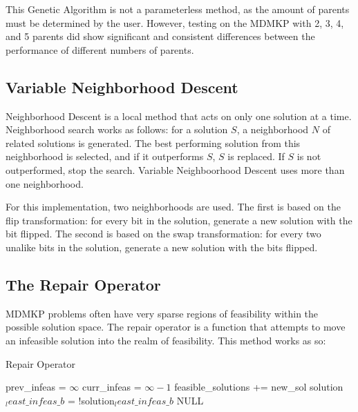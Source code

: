 \documentclass[11pt, letterpaper, onecolumn]{article}
\begin{document}
This Genetic Algorithm is not a parameterless method, as the amount of parents must be determined by the user. However, testing on the MDMKP with 2, 3, 4, and 5 parents did show significant and consistent differences between the performance of different numbers of parents. 

\subsection{Variable Neighborhood Descent}

Neighborhood Descent is a local method that acts on only one solution at a time. Neighborhood search works as follows: for a solution $S$, a neighborhood $N$ of related solutions is generated. The best performing solution from this neighborhood is selected, and if it outperforms $S$, $S$ is replaced. If $S$ is not outperformed, stop the search. Variable Neighboorhood Descent uses more than one neighborhood. 

For this implementation, two neighborhoods are used. The first is based on the flip transformation: for every bit in the solution, generate a new solution with the bit flipped. The second is based on the swap transformation: for every two unalike bits in the solution, generate a new solution with the bits flipped.  

\subsection{The Repair Operator}

MDMKP problems often have very sparse regions of feasibility within the possible solution space. The repair operator is a function that attempts to move an infeasible solution into the realm of feasibility. This method works as so:  

\begin{algorithm}
\caption{Repair Operator}
\begin{algorithmic}
\STATE prev\_infeas = $\infty$
\STATE curr\_infeas = $\infty-1$
\STATE feasible\_solutions += new\_sol
\ENDIF
\ENDIF
\ENDFOR
{}
\ENDIF
\STATE solution$_least\_infeas\_b$ = !solution$_least\_infeas\_b$
\ENDWHILE
\RETURN NULL
\end{algorithmic}
\end{algorithm}
\end{document}
